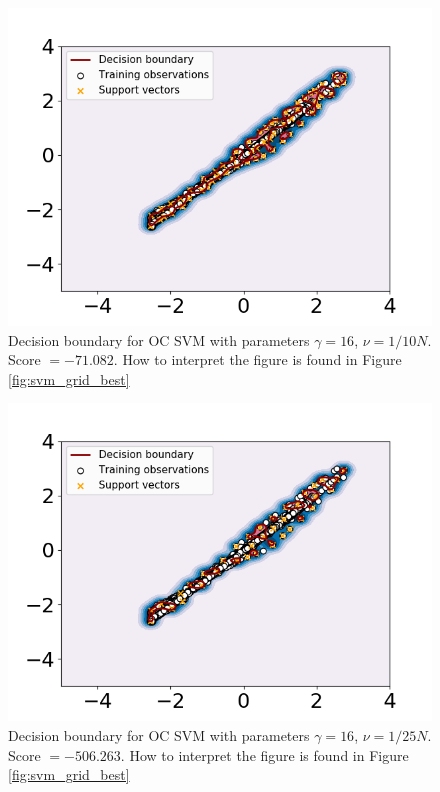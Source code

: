     
    \begin{figure}
        \centering
        \includegraphics[width = .7\textwidth]{report/figures/analysis/gridsearch/Novelty detection, -2 training, gamma = 16 nu = 1.0583130489998942e-05.png}
        \caption{Decision boundary for OC SVM with parameters $\gamma = 16$, $\nu = 1/10N$. Score $=-71.082$. How to interpret the figure is found in Figure \ref{fig:svm_grid_best}}
        \label{fig:my_label}
    \end{figure}
    
    
    \begin{figure}
        \centering
        \includegraphics[width = .7\textwidth]{report/figures/analysis/gridsearch/Novelty detection, -1 training, gamma = 16 nu = 4.233252195999577e-06.png}
        \caption{Decision boundary for OC SVM with parameters $\gamma = 16$, $\nu = 1/25N$. Score $=-506.263$. How to interpret the figure is found in Figure \ref{fig:svm_grid_best}}
        \label{fig:my_label}
    \end{figure}

